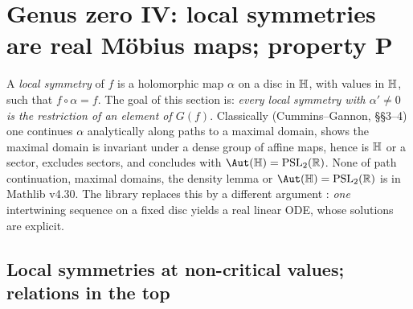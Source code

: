 \section{Genus zero IV: local symmetries are real M\"obius maps; property P}\label{ch19:sec:local}

A \emph{local symmetry} of $f$ is a holomorphic map $\alpha$ on a disc in $\mathbb{H}$, with values in $\mathbb{H}$, such that
$f\circ\alpha=f$.  The goal of this section is: \emph{every local symmetry with $\alpha'\ne0$ is the restriction of an element of
$G(f)$}.  Classically (Cummins--Gannon, \S\S3--4) one continues $\alpha$ analytically along paths to a maximal domain, shows the
maximal domain is invariant under a dense group of affine maps, hence is $\mathbb{H}$ or a sector, excludes sectors, and
concludes with $\Aut(\chnineteenH)=\mathrm{PSL}_2(\chnineteenR)$.  None of path continuation, maximal domains, the density lemma or
$\Aut(\chnineteenH)=\mathrm{PSL}_2(\chnineteenR)$ is in Mathlib v4.30.  The library replaces this by a different argument
: \emph{one} intertwining sequence on a fixed disc yields a real linear ODE, whose solutions are
explicit.

\subsection{Local symmetries at non-critical values; relations in the top}

